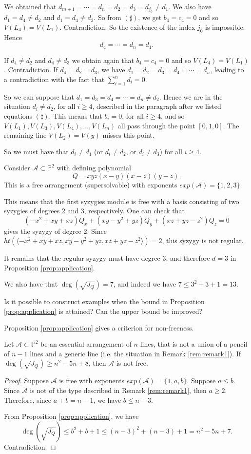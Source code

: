 \documentclass[12pt]{amsart}
\begin{document}
\begin{rem}
We obtained that $d_{m+1}=\cdots=d_n=d_2=d_3=d_{j_0}\neq d_1$. We also have $d_1=d_4\neq d_2$ and $d_1=d_4\neq d_3$. So from $(\sharp)$, we get $b_4=c_4=0$ and so $V(L_4)=V(L_1)$. Contradiction. So the existence of the index $j_0$ is impossible. Hence $$d_4=\cdots=d_n=d_1.$$

If $d_4\neq d_2$ and $d_4\neq d_3$ we obtain again that $b_4=c_4=0$ and so $V(L_4)=V(L_1)$. Contradiction. If $d_4=d_2=d_3$, we have $d_1=d_2=d_3=d_4=\cdots=d_n$, leading to a contradiction with the fact that $\sum_{i=1}^nd_i=0$.

So we can suppose that $d_1=d_3=d_4=\cdots=d_n\neq d_2$. Hence we are in the situation $d_i\neq d_2$, for all $i\geq 4$, described in the paragraph after we listed equations $(\sharp)$. This means that $b_i=0$, for all $i\geq 4$, and so $V(L_1),V(L_3),V(L_4),\ldots,V(L_n)$ all pass through the point $[0,1,0]$. The remaining line $V(L_2)=V(y)$ misses this point.

So we must have that $d_i\neq d_1$ (or $d_i\neq d_2$, or $d_i\neq d_3$) for all $i\geq 4$.
\end{rem}

\begin{exm}\label{exm:example2} Consider $\mathcal A\subset\mathbb P^2$ with defining polynomial $$Q=xyz(x-y)(x-z)(y-z).$$ This is a free arrangement (supersolvable) with exponents $exp(\mathcal A)=\{1,2,3\}$.

This means that the first syzygies module is free with a basis consisting of two syzygies of degrees 2 and 3, respectively. One can check that $$(-x^2+xy+xz)Q_x+(xy-y^2+yz)Q_y+(xz+yz-z^2)Q_z=0$$ gives the syzygy of degree 2. Since $ht(\langle-x^2+xy+xz,xy-y^2+yz,xz+yz-z^2\rangle)=2$, this syzygy is not regular.

It remains that the regular syzygy must have degree 3, and therefore $d=3$ in Proposition \ref{prop:application}.

We also have that $\deg(\sqrt{J_Q})=7$, and indeed we have $7\leq 3^2+3+1=13$.

Is it possible to construct examples when the bound in Proposition \ref{prop:application} is attained? Can the upper bound be improved?
\end{exm}

Proposition \ref{prop:application} gives a criterion for non-freeness.

\begin{cor}\label{cor:corollary2} Let $\mathcal A\subset\mathbb P^2$ be an essential arrangement of $n$ lines, that is not a union of a pencil of $n-1$ lines and a generic line (i.e. the situation in Remark \ref{rem:remark1}). If $\deg(\sqrt{J_Q})\geq n^2-5n+8$, then $\mathcal A$ is not free.
\end{cor}
\begin{proof} Suppose $\mathcal A$ is free with exponents $exp(\mathcal A)=\{1,a,b\}$. Suppose $a\leq b$. Since $\mathcal A$ is not of the type described in Remark \ref{rem:remark1}, then $a\geq 2$. Therefore, since $a+b=n-1$, we have $b\leq n-3$.

From Proposition \ref{prop:application}, we have $$\deg(\sqrt{J_Q})\leq b^2+b+1\leq (n-3)^2+(n-3)+1=n^2-5n+7.$$ Contradiction.
\end{proof}
\end{document}
